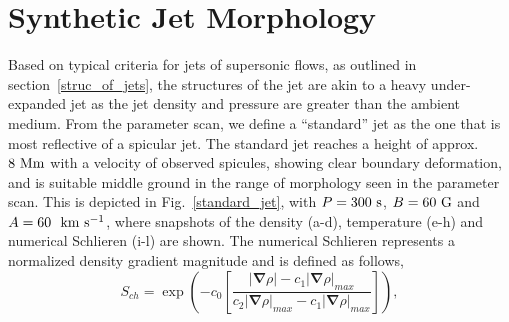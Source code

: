 \section{Synthetic Jet Morphology}
Based on typical criteria for jets of supersonic flows, as outlined in section~\ref{struc_of_jets}, the structures of the jet are akin to a heavy under-expanded jet \citep{Norman1982, Edgington-Mitchell2014} as the jet density and pressure are greater than the ambient medium. From the parameter scan, we define a ``standard'' jet as the one that is most reflective of a spicular jet. The standard jet reaches a height of approx. $8~\rm{Mm}$ with a velocity of observed spicules, showing clear boundary deformation, and is suitable middle ground in the range of morphology seen in the parameter scan. This is depicted in Fig.~\ref{standard_jet}, with $P=300~\rm{s}$, $B=60~\rm{G}$ and $A=60~~\rm{km ~s^{-1}}$, where snapshots of the density (a-d), temperature (e-h) and numerical Schlieren (i-l) are shown. \np
%
The numerical Schlieren represents a normalized density gradient magnitude and is defined as follows,
\begin{equation}
   S_{ch} = \exp{\left( -c_0 \left[ \frac{|\boldsymbol{\nabla} \rho|-c_1 |\boldsymbol{\nabla} \rho|_{max}}{c_2 |\boldsymbol{\nabla} \rho|_{max}-c_1|\boldsymbol{\nabla} \rho|_{max}} \right] \right)},
\end{equation}
